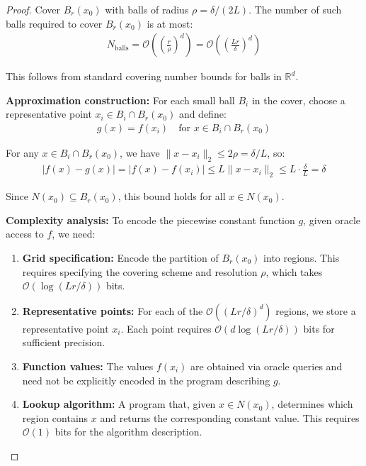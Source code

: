 \documentclass[11pt,letter,leqno]{article}
\begin{document}
\begin{proof}
Cover $B_r(x_0)$ with balls of radius $\rho = \delta/(2L)$. The number of such balls required to cover $B_r(x_0)$ is at most:
\begin{align}
N_{\text{balls}} = \mathcal{O}\left(\left(\frac{r}{\rho}\right)^d\right) = \mathcal{O}\left(\left(\frac{Lr}{\delta}\right)^d\right)
\end{align}

This follows from standard covering number bounds for balls in $\mathbb{R}^d$.

\textbf{Approximation construction:} For each small ball $B_i$ in the cover, choose a representative point $x_i \in B_i \cap B_r(x_0)$ and define:
\begin{align}
g(x) = f(x_i) \quad \text{for } x \in B_i \cap B_r(x_0)
\end{align}

For any $x \in B_i \cap B_r(x_0)$, we have $\|x - x_i\|_2 \leq 2\rho = \delta/L$, so:
\begin{align}
|f(x) - g(x)| = |f(x) - f(x_i)| \leq L\|x - x_i\|_2 \leq L \cdot \frac{\delta}{L} = \delta
\end{align}

Since $N(x_0) \subseteq B_r(x_0)$, this bound holds for all $x \in N(x_0)$.

\textbf{Complexity analysis:} To encode the piecewise constant function $g$, given oracle access to $f$, we need:
\begin{enumerate}
\item \textbf{Grid specification:} Encode the partition of $B_r(x_0)$ into regions. This requires specifying the covering scheme and resolution $\rho$, which takes $\mathcal{O}(\log(Lr/\delta))$ bits.

\item \textbf{Representative points:} For each of the $\mathcal{O}((Lr/\delta)^d)$ regions, we store a representative point $x_i$. Each point requires $\mathcal{O}(d \log(Lr/\delta))$ bits for sufficient precision.

\item \textbf{Function values:} The values $f(x_i)$ are obtained via oracle queries and need not be explicitly encoded in the program describing $g$.

\item \textbf{Lookup algorithm:} A program that, given $x \in N(x_0)$, determines which region contains $x$ and returns the corresponding constant value. This requires $\mathcal{O}(1)$ bits for the algorithm description.
\end{enumerate}


\end{proof}
\end{document}
